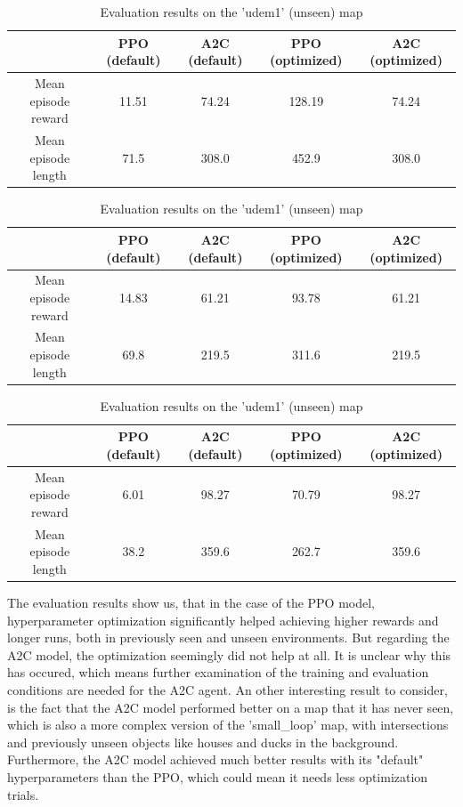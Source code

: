\documentclass{article}
\begin{document}
\begin{table}[H]
	\caption{Evaluation results on the 'zigzag\_dists' (seen) map}
	\begin{center}
	\begin{tabular}{|c| c| c| c| c|}
		\hline
	  & PPO (default) & A2C (default) & PPO (optimized) & A2C (optimized) \\
	\hline
	Mean episode reward & 11.51 & 74.24 & 128.19 & 74.24 \\
	\hline
	Mean episode length & 71.5 & 308.0 & 452.9& 308.0 \\
	\hline
	\end{tabular}
	\end{center}
	\label{t:zigzagdists}

	\caption{Evaluation results on the 'small\_loop' (unseen) map}
	\begin{center}
	\begin{tabular}{|c| c | c| c | c|}
		\hline
	  & PPO (default) & A2C (default) & PPO (optimized) & A2C (optimized) \\
	\hline
	Mean episode reward & 14.83 & 61.21 & 93.78 & 61.21 \\
	\hline
	Mean episode length & 69.8 & 219.5 & 311.6 & 219.5 \\
	\hline
	\end{tabular}
	\end{center}
	\label{t:smalloop}

	\caption{Evaluation results on the 'udem1' (unseen) map}
	\begin{center}
	\begin{tabular}{|c| c| c| c| c|}
		\hline
	  & PPO (default) & A2C (default) & PPO (optimized) & A2C (optimized) \\
	\hline
	Mean episode reward & 6.01 & 98.27 & 70.79 & 98.27 \\
	\hline
	Mean episode length & 38.2 & 359.6 & 262.7 & 359.6 \\
	\hline
	\end{tabular}
	\end{center}
	\label{t:udem1}
\end{table}

The evaluation results show us, that in the case of the PPO model, hyperparameter optimization significantly helped achieving higher rewards and longer runs, both in previously seen and unseen environments. 
But regarding the A2C model, the optimization seemingly did not help at all. It is unclear why this has occured, which means further examination of the training and evaluation conditions are needed for the A2C agent.
An other interesting result to consider, is the fact that the A2C model performed better on a map that it has never seen, which is also a more complex version of the 'small\_loop' map, with intersections and previously unseen objects like houses and ducks in the background.
Furthermore, the A2C model achieved much better results with its "default" hyperparameters than the PPO, which could mean it needs less optimization trials. 
\end{document}
